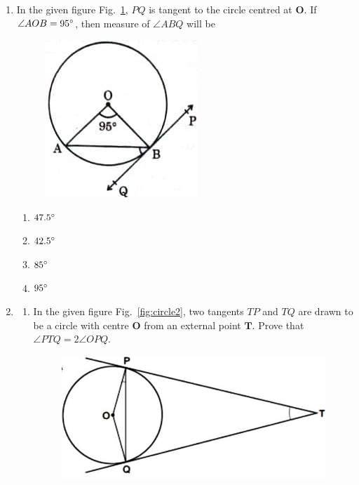 \documentclass{article}
\let\vec\mathbf
\newcommand\figref{Fig.~\ref}
\begin{document}
\begin{enumerate}
	\item In the given figure \figref{fig:circle1}, $ PQ $ is tangent to the circle centred at $ \vec{O} $. If $ \angle{AOB} = 95{\degree} $, then measure of $ \angle{ABQ} $ will be
	\begin{figure}[H]
		\centering
		\includegraphics[width=\columnwidth]{fig1.jpg}
		\caption{}
		\label{fig:circle1}
	\end{figure}
		\begin{enumerate}
			\item $ 47.5{\degree} $
			\item $ 42.5{\degree} $
			\item $ 85{\degree} $
			\item $ 95{\degree} $
		\end{enumerate}
	\item
		\begin{enumerate}
			\item In the given figure \figref{fig:circle2}, two tangents $ TP $ and $ TQ $ are drawn to be a circle with centre $ \vec{O} $ from an external point $ \vec{T} $. Prove that $ \angle{PTQ} = 2\angle{OPQ} $.
		\begin{figure}[H]
			\centering
			\includegraphics[width=\columnwidth]{fig2.jpg}

\end{figure}
\end{enumerate}
\end{enumerate}
\end{document}
